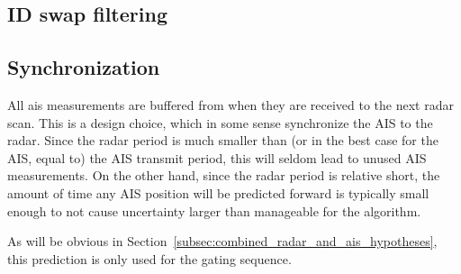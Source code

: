 \subsection{ID swap filtering}


\subsection{Synchronization}
All \gls{ais} measurements are buffered from when they are received to the next radar scan. This is a design choice, which in some sense synchronize the AIS to the radar. Since the radar period is much smaller than (or in the best case for the AIS, equal to) the AIS transmit period, this will seldom lead to unused AIS measurements. On the other hand, since the radar period is relative short, the amount of time any AIS position will be predicted forward is typically small enough to not cause uncertainty larger than manageable for the algorithm. 

As will be obvious in Section~\ref{subsec:combined_radar_and_ais_hypotheses}, this prediction is only used for the gating sequence.


